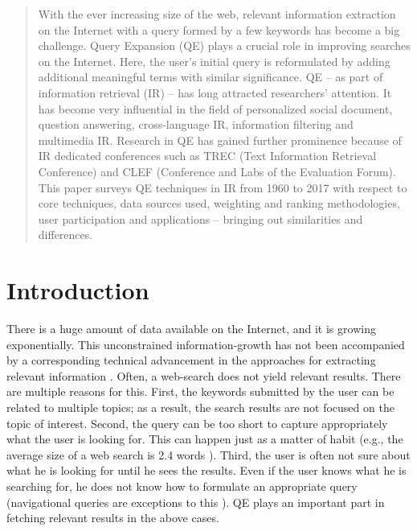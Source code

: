 \date{Received: date / Accepted: date}


\maketitle

\begin{abstract}
With the ever increasing size of the web, relevant information extraction on the Internet with a query formed by a few keywords has become a big challenge. Query Expansion (QE) plays a crucial role in improving searches on the Internet. Here, the user's initial query is reformulated  by adding additional meaningful terms with similar significance. QE -- as part of  information retrieval (IR)  -- has long attracted researchers' attention. It has become very influential  in the field of personalized social document, question answering, cross-language IR, information filtering and multimedia IR. Research in QE has gained further prominence because of IR dedicated conferences such as TREC (Text Information Retrieval Conference) and CLEF (Conference and Labs of the Evaluation Forum).  This paper surveys QE techniques in IR from 1960 to 2017 with respect to core techniques, data sources used, weighting and ranking methodologies, user participation and applications  -- bringing out similarities and differences. 
\end{abstract}

\section{Introduction}
There is a huge amount of data available on the Internet, and it is growing exponentially. This unconstrained information-growth has not been accompanied by a corresponding technical advancement in the approaches for extracting relevant information \cite{mikroyannidis2007toward}. Often, a web-search does not yield relevant results. There are multiple reasons for this. First, the keywords submitted by the user can be related to multiple topics; as a result, the search results are not focused on the topic of interest. Second, the query can be too short to  capture appropriately what the user is looking for. This can happen just as a matter of habit (e.g., the average size of a web search is 2.4 words \cite{sta,spink2001searching}). Third, the user is often not sure about what he is looking for until he sees the results.   Even if the user knows what he is searching for, he does not know how to formulate an appropriate query (navigational queries are exceptions to this \cite{broder2002taxonomy}). QE plays an important part in fetching relevant results in the above cases. 

